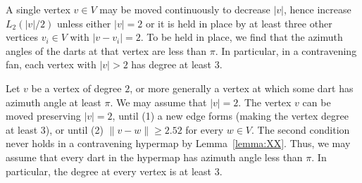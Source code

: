 A single vertex $v\in V$ may be moved continuously to decrease $|v|$, hence
increase $L_2(|v|/2)$ unless either $|v|=2$ or it is held in place by at least three other vertices $v_i\in V$ with $|v-v_i|=2$.   To be held in place, we find that the azimuth angles of the darts at that vertex are less than $\pi$.   In particular, in a contravening fan,  each vertex with $|v|>2$ has degree at least $3$.
 
Let $v$ be a vertex of degree $2$, or more generally a vertex at which some dart has azimuth angle at least $\pi$.  We may assume that $|v|=2$.
The vertex $v$ can be moved preserving $|v|=2$, until (1) a new edge forms (making the vertex degree at least $3$),  or until (2) $\|v-w\|\ge 2.52$ for every $w\in V$.   The second condition never holds in a contravening hypermap by Lemma~\ref{lemma:XX}.  Thus, we may assume that every dart in the hypermap has azimuth angle less than $\pi$.  In particular, the degree at every vertex is at least $3$.

